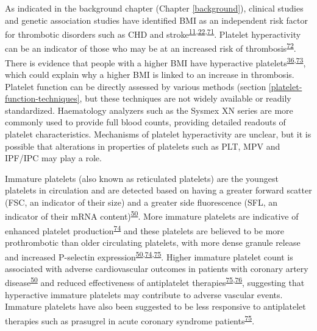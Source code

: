 \documentclass[11pt,twoside]{bristolthesis}
\begin{document}
As indicated in the background chapter (Chapter \ref{background}), clinical studies and genetic association studies have identified BMI as an independent risk factor for thrombotic disorders such as CHD and stroke\textsuperscript{\protect\hyperlink{ref-Nordestgaard2012}{11},\protect\hyperlink{ref-Dale2017}{22},\protect\hyperlink{ref-Wolk2003a}{71}}. Platelet hyperactivity can be an indicator of those who may be at an increased risk of thrombosis\textsuperscript{\protect\hyperlink{ref-Puurunen2018}{72}}. There is evidence that people with a higher BMI have hyperactive platelets\textsuperscript{\protect\hyperlink{ref-Nardin2015}{36},\protect\hyperlink{ref-Barrachina2019}{73}}, which could explain why a higher BMI is linked to an increase in thrombosis. Platelet function can be directly assessed by various methods (section \ref{platelet-function-techniques}, but these techniques are not widely available or readily standardized. Haematology analyzers such as the Sysmex XN series are more commonly used to provide full blood counts, providing detailed readouts of platelet characteristics. Mechanisms of platelet hyperactivity are unclear, but it is possible that alterations in properties of platelets such as PLT, MPV and IPF/IPC may play a role.

Immature platelets (also known as reticulated platelets) are the youngest platelets in circulation and are detected based on having a greater forward scatter (FSC, an indicator of their size) and a greater side fluorescence (SFL, an indicator of their mRNA content)\textsuperscript{\protect\hyperlink{ref-Ibrahim2014}{50}}. More immature platelets are indicative of enhanced platelet production\textsuperscript{\protect\hyperlink{ref-Lev2016a}{74}} and these platelets are believed to be more prothrombotic than older circulating platelets, with more dense granule release and increased P-selectin expression\textsuperscript{\protect\hyperlink{ref-Ibrahim2014}{50},\protect\hyperlink{ref-Lev2016a}{74},\protect\hyperlink{ref-Bernlochner2015a}{75}}. Higher immature platelet count is associated with adverse cardiovascular outcomes in patients with coronary artery disease\textsuperscript{\protect\hyperlink{ref-Ibrahim2014}{50}} and reduced effectiveness of antiplatelet therapies\textsuperscript{\protect\hyperlink{ref-Bernlochner2015a}{75},\protect\hyperlink{ref-Ibrahim2012}{76}}, suggesting that hyperactive immature platelets may contribute to adverse vascular events. Immature platelets have also been suggested to be less responsive to antiplatelet therapies such as prasugrel in acute coronary syndrome patients\textsuperscript{\protect\hyperlink{ref-Bernlochner2015a}{75}}.
\end{document}
